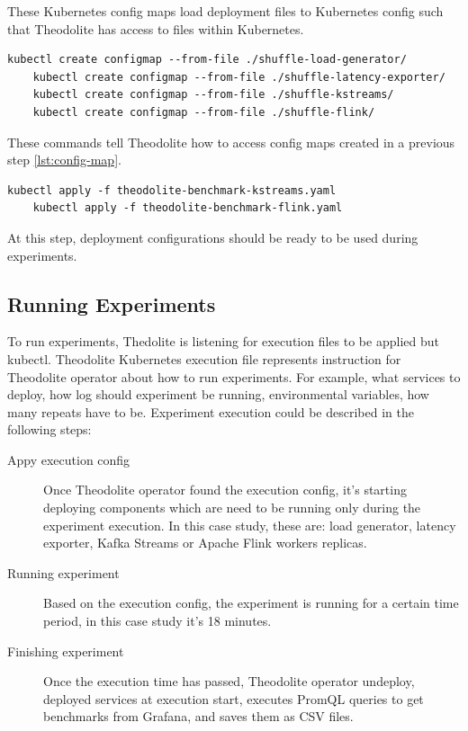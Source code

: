 These Kubernetes config maps load deployment files to Kubernetes config such that Theodolite
has access to files within Kubernetes.
\begin{lstlisting}[label={lst:config-map}]
    kubectl create configmap --from-file ./shuffle-load-generator/
    kubectl create configmap --from-file ./shuffle-latency-exporter/
    kubectl create configmap --from-file ./shuffle-kstreams/
    kubectl create configmap --from-file ./shuffle-flink/
\end{lstlisting}


These commands tell Theodolite how to access config maps created in a previous step \ref{lst:config-map}.
\begin{lstlisting}[label={lst:config-map-theodo}]
    kubectl apply -f theodolite-benchmark-kstreams.yaml
    kubectl apply -f theodolite-benchmark-flink.yaml
\end{lstlisting}

At this step, deployment configurations should be ready to be used during experiments.


\subsection{Running Experiments}\label{subsec:running-experiments}
To run experiments, Thedolite is listening for execution files to be applied but
kubectl.
Theodolite Kubernetes execution file represents instruction for Theodolite operator
about how to run experiments.
For example, what services to deploy, how log should experiment be running, environmental
variables, how many repeats have to be.
Experiment execution could be described in the following steps:

\begin{description}
    \item[Appy execution config] Once Theodolite operator found the execution config, it's
    starting deploying components which are need to be running only during the experiment execution.
    In this case study, these are: load generator, latency exporter, Kafka Streams or Apache Flink
    workers replicas.
    \item[Running experiment] Based on the execution config, the experiment is running for a certain
    time period, in this case study it's 18 minutes.
    \item[Finishing experiment] Once the execution time has passed, Theodolite operator undeploy,
    deployed services at execution start, executes PromQL queries to get benchmarks from Grafana,
    and saves them as CSV files.
\end{description}

